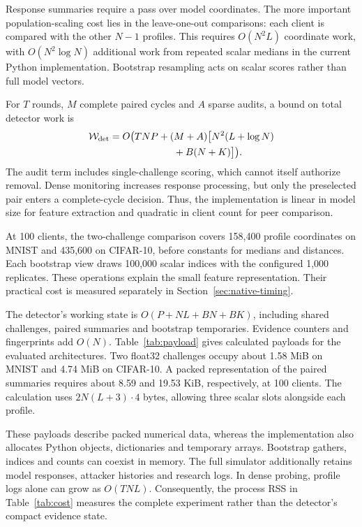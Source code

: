 \documentclass[conference]{IEEEtran}
\makeatletter
\renewcommand{\subsection}{\@startsection{subsection}{2}{\z@}{1.5ex}{0.7ex}{\normalfont\normalsize\itshape}}
\makeatother
\begin{document}
Response summaries require a pass over model coordinates. The more
important population-scaling cost lies in the leave-one-out comparisons:
each client is compared with the other $N-1$ profiles. This requires
$O(N^2L)$ coordinate work, with $O(N^2\log N)$ additional work from
repeated scalar medians in the current Python implementation. Bootstrap
resampling acts on scalar scores rather than full model vectors.

For $T$ rounds, $M$ complete paired cycles and $A$ sparse audits, a bound
on total detector work is
\begin{equation}
\begin{aligned}
 \mathcal W_{\rm det}=O\bigl(&TNP+(M+A)\bigl[N^2(L+\log N)\\
          &\hspace{4em}+B(N+K)\bigr]\bigr).
\end{aligned}
\end{equation}
The audit term includes single-challenge scoring, which cannot itself
authorize removal. Dense monitoring increases response processing, but
only the preselected pair enters a complete-cycle decision.
Thus, the implementation is linear in model size for feature extraction
and quadratic in client count for peer comparison.

At 100 clients, the two-challenge comparison covers 158,400 profile
coordinates on MNIST and 435,600 on CIFAR-10, before constants for
medians and distances. Each bootstrap view draws 100,000 scalar indices
with the configured 1,000 replicates. These operations explain the small
feature representation. Their practical cost is measured separately in
Section~\ref{sec:native-timing}.

\subsection{Memory and Communication}
The detector's working state is
$O(P+NL+BN+BK)$, including shared challenges, paired summaries and
bootstrap temporaries. Evidence counters and fingerprints add $O(N)$.
Table~\ref{tab:payload} gives calculated payloads for the evaluated
architectures. Two float32 challenges occupy about 1.58 MiB on MNIST and
4.74 MiB on CIFAR-10. A packed representation of the paired summaries
requires about 8.59 and 19.53 KiB, respectively, at 100 clients.
The calculation uses $2N(L+3)\cdot4$ bytes, allowing three scalar slots
alongside each profile.


These payloads describe packed numerical data, whereas the implementation
also allocates Python objects, dictionaries and temporary arrays.
Bootstrap gathers, indices and counts can coexist in memory. The full
simulator additionally retains model responses, attacker histories and
research logs. In dense probing, profile logs alone can grow as
$O(TNL)$. Consequently, the process RSS in Table~\ref{tab:cost} measures
the complete experiment rather than the detector's compact evidence
state.
\end{document}
